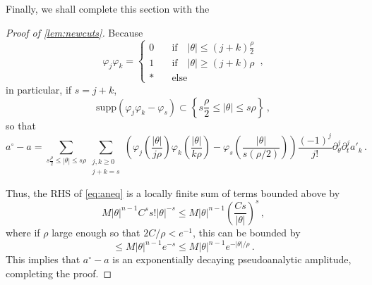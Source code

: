 \documentclass[
	fontsize=11pt, 
	twoside=false, 
	abstract=true, 
	a4paper,
]{scrartcl}
\newcommand{\RR}{\mathbb{R}}
\newcommand{\abs}[1]{\left\lvert#1\right\rvert}
\newcommand{\del}{\partial}
\newcommand{\supp}{\mathrm{supp}}
\begin{document}
Finally, we shall complete this section with the 
\begin{proof}[Proof of \cref{lem:newcuts}]
	Because
	\[
		\varphi_j\varphi_k= \begin{cases} 0\quad&\text{if}\quad\abs{\theta} \leq (j+k)\frac{\rho}{2}\\ 1\quad&\text{if}\quad\abs{\theta} \geq (j+k)\rho \\ \ast &\text{else}\end{cases}\,,
	\]
	in particular, if $s=j+k$,
	\[
		\supp \left(\varphi_j\varphi_k - \varphi_s\right) \subset \left\{s\frac{\rho}{2} \leq \abs{\theta} \leq s\rho\right\}\,,
	\]
	so that
	\begin{equation}\label{eq:aneq}
		a^{\circ}-a = \sum_{s\frac{\rho}{2} \leq \abs{\theta} \leq s\rho}\sum_{\substack{j,k \geq 0\\j+k=s}}\left(\varphi_j\left(\frac{\abs{\theta}}{j\rho}\right)\varphi_k\left(\frac{\abs{\theta}}{k\rho}\right)-\varphi_s\left(\frac{\abs{\theta}}{s(\rho/2)}\right)\right)\frac{(-1)^j}{j!}\del_\theta^j\del_t^j a'_k\,.
	\end{equation}

	Thus, the RHS of \cref{eq:aneq} is a locally finite sum of terms bounded above by
	\[
		M\abs{\theta}^{n-1} C^s s! \abs{\theta}^{-s} \leq M\abs{\theta}^{n-1} \left(\frac{Cs}{\abs{\theta}}\right)^{s}\,,
	\]
	where if $\rho$ large enough so that $2C/\rho < e^{-1}$, this can be bounded by 
	\[
		\leq M\abs{\theta}^{n-1} e^{-s} \leq M\abs{\theta}^{n-1} e^{-\abs{\theta}/\rho}\,.
	\]
	This implies that $a^{\circ}-a$ is an exponentially decaying pseudoanalytic amplitude, completing the proof.
\end{proof}

%
%
\end{document}
